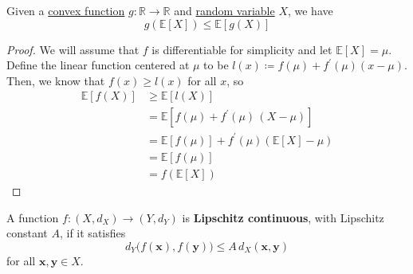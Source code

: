 \begin{lemma}
  \label{thm:jensens-inequality}
Given a \hyperref[mt-def:convex-function]{convex function} $g: \mathbb{R} \rightarrow \mathbb{R}$ and \hyperref[prob-def:random-variable]{random variable} $X$, we have 
\begin{equation}
  g(\mathbb{E}[X]) \leq \mathbb{E}[g(X)]
\end{equation}
\end{lemma}
\begin{proof}
We will assume that $f$ is differentiable for simplicity and let $\mathbb{E}[X] = \mu$. Define the linear function centered at $\mu$ to be $l(x) \coloneqq f(\mu) + f^\prime (\mu) (x - \mu)$. Then, we know that $f(x) \geq l(x)$ for all $x$, so 
\begin{align*}
    \mathbb{E}[f(X)] & \geq \mathbb{E}[ l(X)] \\ 
    & = \mathbb{E}[f(\mu) + f^\prime (\mu) \, (X - \mu)] \\
    & = \mathbb{E}[f(\mu)] + f^\prime (\mu) ( \mathbb{E}[X] - \mu) \\
    & = \mathbb{E}[f(\mu)] \\
    & = f(\mathbb{E}[X])
\end{align*}
\end{proof}

\begin{definition}
  \label{def:lipschitz-continuity}
A function $f: (X, d_X) \to (Y, d_Y)$ is \textbf{Lipschitz continuous}, with Lipschitz constant $A$, if it satisfies 
\begin{equation}
  d_Y \big( f(\mathbf{x}), f(\mathbf{y})\big) \leq A \, d_X (\mathbf{x}, \mathbf{y})
\end{equation}
for all $\mathbf{x}, \mathbf{y} \in X$. 
\end{definition}
